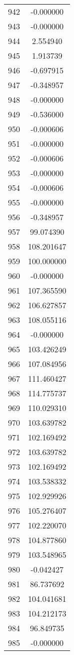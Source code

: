 \documentclass[12pt]{article}
\begin{document}
\begin{longtable}{@{}cc@{}}
942 & -0.000000 \\
943 & -0.000000 \\
944 & 2.554940 \\
945 & 1.913739 \\
946 & -0.697915 \\
947 & -0.348957 \\
948 & -0.000000 \\
949 & -0.536000 \\
950 & -0.000606 \\
951 & -0.000000 \\
952 & -0.000606 \\
953 & -0.000000 \\
954 & -0.000606 \\
955 & -0.000000 \\
956 & -0.348957 \\
957 & 99.074390 \\
958 & 108.201647 \\
959 & 100.000000 \\
960 & -0.000000 \\
961 & 107.365590 \\
962 & 106.627857 \\
963 & 108.055116 \\
964 & -0.000000 \\
965 & 103.426249 \\
966 & 107.084956 \\
967 & 111.460427 \\
968 & 114.775737 \\
969 & 110.029310 \\
970 & 103.639782 \\
971 & 102.169492 \\
972 & 103.639782 \\
973 & 102.169492 \\
974 & 103.538332 \\
975 & 102.929926 \\
976 & 105.276407 \\
977 & 102.220070 \\
978 & 104.877860 \\
979 & 103.548965 \\
980 & -0.042427 \\
981 & 86.737692 \\
982 & 104.041681 \\
983 & 104.212173 \\
984 & 96.849735 \\
985 & -0.000000 \\

\end{longtable}
\end{document}
